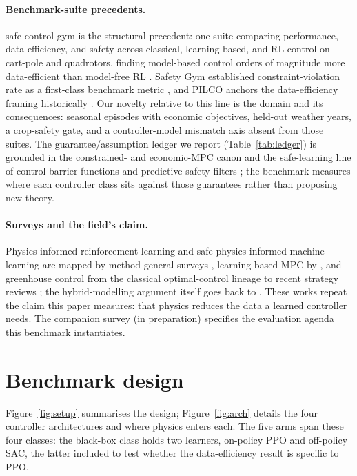 \documentclass[11pt]{article}
\begin{document}
\paragraph{Benchmark-suite precedents.} safe-control-gym is the structural precedent: one suite comparing performance, data efficiency, and safety across classical, learning-based, and RL control on cart-pole and quadrotors, finding model-based control orders of magnitude more data-efficient than model-free RL \citep{yuan2022safecontrolgym}. Safety Gym established constraint-violation rate as a first-class benchmark metric \citep{ray2019safetygym}, and PILCO anchors the data-efficiency framing historically \citep{deisenroth2011pilco}. Our novelty relative to this line is the domain and its consequences: seasonal episodes with economic objectives, held-out weather years, a crop-safety gate, and a controller-model mismatch axis absent from those suites. The guarantee/assumption ledger we report (Table~\ref{tab:ledger}) is grounded in the constrained- and economic-MPC canon \citep{mayne2000constrained, angeli2012economicmpc} and the safe-learning line of control-barrier functions and predictive safety filters \citep{ames2019cbf, wabersich2021safetyfilter}; the benchmark measures where each controller class sits against those guarantees rather than proposing new theory.

\paragraph{Surveys and the field's claim.} Physics-informed reinforcement learning and safe physics-informed machine learning are mapped by method-general surveys \citep{banerjee2025pirl, drgona2025safepiml, nghiem2023pimlcontrol}, learning-based MPC by \citet{hewing2020lbmpc}, and greenhouse control from the classical optimal-control lineage \citep{vanstraten2010survey} to recent strategy reviews \citep{greenhouse_control_review_2025, goldenits2024rldt}; the hybrid-modelling argument itself goes back to \citet{karniadakis2021physics}. These works repeat the claim this paper measures: that physics reduces the data a learned controller needs. The companion survey (in preparation) specifies the evaluation agenda this benchmark instantiates.

\section{Benchmark design}\label{sec:design}

Figure~\ref{fig:setup} summarises the design; Figure~\ref{fig:arch} details the four controller architectures and where physics enters each. The five arms span these four classes: the black-box class holds two learners, on-policy PPO and off-policy SAC, the latter included to test whether the data-efficiency result is specific to PPO.
\end{document}
